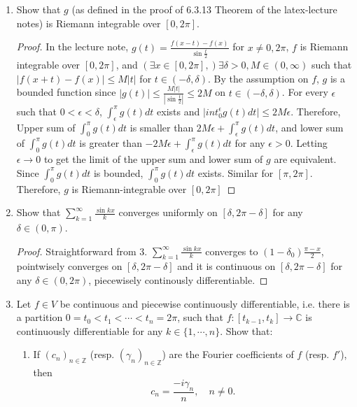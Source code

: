 \documentclass{article}
\begin{document}
\setlength{\parindent}{0cm}


\begin{enumerate}[font = \Large\bfseries\itshape\space, leftmargin = 3mm, labelsep = 3mm]
\item
Show that $g$ (as defined in the proof of 6.3.13 Theorem of the latex-lecture notes) is Riemann integrable over $[0,2\pi]$.
\begin{proof}
In the lecture note, $g(t) = \frac{f(x-t)-f(x)}{\sin\frac{t}{2}}$ for $x \neq 0,2\pi$, $f$ is Riemann integrable over $[0,2\pi]$, and $(\exists x \in [0,2\pi],) \exists \delta > 0, M \in (0,\infty)$ such that $|f(x+t)-f(x)| \leq M|t|$ for $t \in (-\delta,\delta)$.
By the assumption on $f$, $g$ is a bounded function since $|g(t)| \leq \frac{M|t|}{|\sin\frac{t}{2}|} \leq 2M$ on $t \in (-\delta,\delta)$. %
For every $\epsilon$ such that $0 < \epsilon < \delta$, $\int_\epsilon^\pi g(t)dt$ exists and $|int_0^\epsilon g(t)dt| \leq 2M\epsilon$.
Therefore, Upper sum of $\int_0^\pi g(t)dt$ is smaller than $2M\epsilon + \int_\epsilon^\pi g(t)dt$, and lower sum of $\int_0^\pi g(t)dt$ is greater than $-2M\epsilon + \int_\epsilon^\pi g(t)dt$ for any $\epsilon > 0$.
Letting $\epsilon \rightarrow 0$ to get the limit of the upper sum and lower sum of $g$ are equivalent.
Since $\int_0^\pi g(t)dt$ is bounded, $\int_0^\pi g(t)dt$ exists.
Similar for $[\pi,2\pi]$.
Therefore, $g$ is Riemann-integrable over $[0,2\pi]$
\end{proof}

\item
Show that $\sum_{k=1}^\infty \frac{\sin kx}{k}$ converges uniformly on $[\delta, 2\pi-\delta]$ for any $\delta \in (0,\pi)$.
\begin{proof}
Straightforward from 3.
$\sum_{k=1}^\infty \frac{\sin kx}{k}$ converges to $(1-\delta_0)\frac{\pi-x}{2}$, pointwisely converges on $[\delta,2\pi-\delta]$ and it is continuous on $[\delta,2\pi-\delta]$ for any $\delta \in (0,2\pi)$, piecewisely continously differentiable.
\end{proof}

\item
Let $f \in V$ be continuous and piecewise continuously differentiable, i.e. there is a partition $0 = t_0 < t_1 < \cdots < t_n = 2\pi$, such that
$f : [t_{k-1}, t_k] \rightarrow \mathbb{C}$ is continuously differentiable for any $k \in \{ 1,\cdots, n\}$.
Show that:
\begin{enumerate}[label=(\roman*)]
\item If $(c_n)_{n\in\mathbb{Z}}$ (resp. $(\gamma_n)_{n\in\mathbb{Z}}$) are the Fourier coefficients of $f$ (resp. $f'$), then
$$c_n = \frac{-i\gamma_n}{n}, \quad n \neq 0.$$


\end{enumerate}
\end{enumerate}
\end{document}
